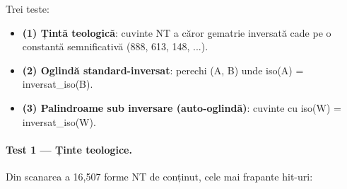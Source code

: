 \documentclass[12pt,a4paper,twoside,openany]{book}
\begin{document}
Trei teste:
\begin{itemize}
\item \textbf{(1) Țintă teologică}: cuvinte NT a căror gematrie inversată cade pe o constantă semnificativă (888, 613, 148, ...).
\item \textbf{(2) Oglindă standard-inversat}: perechi (A, B) unde iso(A) = inversat\_iso(B).
\item \textbf{(3) Palindroame sub inversare (auto-oglindă)}: cuvinte cu iso(W) = inversat\_iso(W).
\end{itemize}

\paragraph*{Test 1 --- Ținte teologice.} Din scanarea a 16{,}507 forme NT de conținut, cele mai frapante hit-uri:
\end{document}

